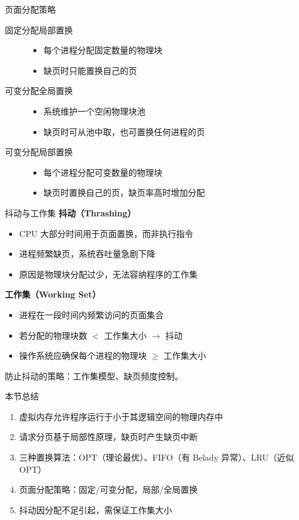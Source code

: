 \documentclass[10pt, aspectratio=169]{beamer}
\begin{document}
\begin{frame}{页面分配策略}
    \begin{description}
        \item[固定分配局部置换]
            \begin{itemize}
                \item 每个进程分配固定数量的物理块
                \item 缺页时只能置换自己的页
            \end{itemize}
        \item[可变分配全局置换]
            \begin{itemize}
                \item 系统维护一个空闲物理块池
                \item 缺页时可从池中取，也可置换任何进程的页
            \end{itemize}
        \item[可变分配局部置换]
            \begin{itemize}
                \item 每个进程分配可变数量的物理块
                \item 缺页时置换自己的页，缺页率高时增加分配
            \end{itemize}
    \end{description}
\end{frame}

\begin{frame}{抖动与工作集}
    \textbf{抖动（Thrashing）}
    \begin{itemize}
        \item CPU 大部分时间用于页面置换，而非执行指令
        \item 进程频繁缺页，系统吞吐量急剧下降
        \item 原因是物理块分配过少，无法容纳程序的工作集
    \end{itemize}
    \vspace{0.5em}
    \textbf{工作集（Working Set）}
    \begin{itemize}
        \item 进程在一段时间内频繁访问的页面集合
        \item 若分配的物理块数 $<$ 工作集大小 $\rightarrow$ 抖动
        \item 操作系统应确保每个进程的物理块 $\geq$ 工作集大小
    \end{itemize}
    \vspace{0.5em}
    防止抖动的策略：工作集模型、缺页频度控制。
\end{frame}

\begin{frame}{本节总结}
    \begin{enumerate}
        \item 虚拟内存允许程序运行于小于其逻辑空间的物理内存中
        \item 请求分页基于局部性原理，缺页时产生缺页中断
        \item 三种置换算法：OPT（理论最优）、FIFO（有 Belady 异常）、LRU（近似 OPT）
        \item 页面分配策略：固定/可变分配，局部/全局置换
        \item 抖动因分配不足引起，需保证工作集大小
    \end{enumerate}
\end{frame}
\end{document}
